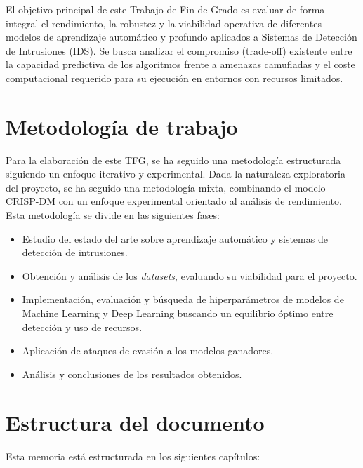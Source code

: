 El objetivo principal de este Trabajo de Fin de Grado es evaluar de forma integral el rendimiento, la robustez y la viabilidad operativa de diferentes modelos de aprendizaje automático y profundo aplicados a Sistemas de Detección de Intrusiones (IDS). Se busca analizar el compromiso (trade-off) existente entre la capacidad predictiva de los algoritmos frente a amenazas camufladas y el coste computacional requerido para su ejecución en entornos con recursos limitados.

\section{Metodología de trabajo}

Para la elaboración de este TFG, se ha seguido una metodología estructurada siguiendo un enfoque iterativo y experimental. Dada la naturaleza exploratoria del proyecto, se ha seguido una metodología mixta, combinando el modelo CRISP-DM con un enfoque experimental orientado al análisis de rendimiento.
Esta metodología se divide en las siguientes fases:

\begin{itemize}
    \item Estudio del estado del arte sobre aprendizaje automático y sistemas de detección de intrusiones.
    \item Obtención y análisis de los \textit{datasets}, evaluando su viabilidad para el proyecto.
    \item Implementación, evaluación y búsqueda de hiperparámetros de modelos de Machine Learning y Deep Learning buscando un equilibrio óptimo entre detección y uso de recursos.
    \item Aplicación de ataques de evasión a los modelos ganadores.
    \item Análisis y conclusiones de los resultados obtenidos.
\end{itemize}

\section{Estructura del documento}

Esta memoria está estructurada en los siguientes capítulos:

